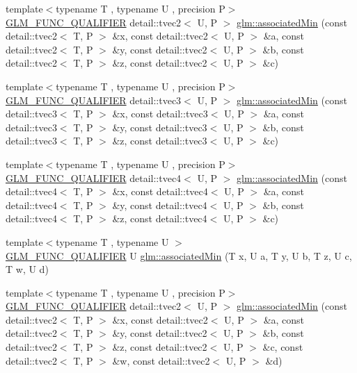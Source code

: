 \begin{DoxyCompactItemize}
\item 
{\footnotesize template$<$typename T , typename U , precision P$>$ }\\\hyperlink{setup_8hpp_a33fdea6f91c5f834105f7415e2a64407}{G\+L\+M\+\_\+\+F\+U\+N\+C\+\_\+\+Q\+U\+A\+L\+I\+F\+I\+ER} detail\+::tvec2$<$ U, P $>$ \hyperlink{namespaceglm_aa435fc5c6ffb758dfc2b9628d90da4f5}{glm\+::associated\+Min} (const detail\+::tvec2$<$ T, P $>$ \&x, const detail\+::tvec2$<$ U, P $>$ \&a, const detail\+::tvec2$<$ T, P $>$ \&y, const detail\+::tvec2$<$ U, P $>$ \&b, const detail\+::tvec2$<$ T, P $>$ \&z, const detail\+::tvec2$<$ U, P $>$ \&c)
\item 
{\footnotesize template$<$typename T , typename U , precision P$>$ }\\\hyperlink{setup_8hpp_a33fdea6f91c5f834105f7415e2a64407}{G\+L\+M\+\_\+\+F\+U\+N\+C\+\_\+\+Q\+U\+A\+L\+I\+F\+I\+ER} detail\+::tvec3$<$ U, P $>$ \hyperlink{namespaceglm_a71615041a85263b9e375eb82b65e7886}{glm\+::associated\+Min} (const detail\+::tvec3$<$ T, P $>$ \&x, const detail\+::tvec3$<$ U, P $>$ \&a, const detail\+::tvec3$<$ T, P $>$ \&y, const detail\+::tvec3$<$ U, P $>$ \&b, const detail\+::tvec3$<$ T, P $>$ \&z, const detail\+::tvec3$<$ U, P $>$ \&c)
\item 
{\footnotesize template$<$typename T , typename U , precision P$>$ }\\\hyperlink{setup_8hpp_a33fdea6f91c5f834105f7415e2a64407}{G\+L\+M\+\_\+\+F\+U\+N\+C\+\_\+\+Q\+U\+A\+L\+I\+F\+I\+ER} detail\+::tvec4$<$ U, P $>$ \hyperlink{namespaceglm_a18facea65271c205a884578e54d8670f}{glm\+::associated\+Min} (const detail\+::tvec4$<$ T, P $>$ \&x, const detail\+::tvec4$<$ U, P $>$ \&a, const detail\+::tvec4$<$ T, P $>$ \&y, const detail\+::tvec4$<$ U, P $>$ \&b, const detail\+::tvec4$<$ T, P $>$ \&z, const detail\+::tvec4$<$ U, P $>$ \&c)
\item 
{\footnotesize template$<$typename T , typename U $>$ }\\\hyperlink{setup_8hpp_a33fdea6f91c5f834105f7415e2a64407}{G\+L\+M\+\_\+\+F\+U\+N\+C\+\_\+\+Q\+U\+A\+L\+I\+F\+I\+ER} U \hyperlink{namespaceglm_a56ba6db426e264cc11b87d4603a89d48}{glm\+::associated\+Min} (T x, U a, T y, U b, T z, U c, T w, U d)
\item 
{\footnotesize template$<$typename T , typename U , precision P$>$ }\\\hyperlink{setup_8hpp_a33fdea6f91c5f834105f7415e2a64407}{G\+L\+M\+\_\+\+F\+U\+N\+C\+\_\+\+Q\+U\+A\+L\+I\+F\+I\+ER} detail\+::tvec2$<$ U, P $>$ \hyperlink{namespaceglm_af41a217c135ae0278cce57ab86379752}{glm\+::associated\+Min} (const detail\+::tvec2$<$ T, P $>$ \&x, const detail\+::tvec2$<$ U, P $>$ \&a, const detail\+::tvec2$<$ T, P $>$ \&y, const detail\+::tvec2$<$ U, P $>$ \&b, const detail\+::tvec2$<$ T, P $>$ \&z, const detail\+::tvec2$<$ U, P $>$ \&c, const detail\+::tvec2$<$ T, P $>$ \&w, const detail\+::tvec2$<$ U, P $>$ \&d)

\end{DoxyCompactItemize}
